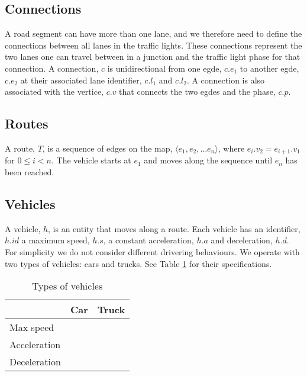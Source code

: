 \subsection{Connections}
A road segment can have more than one lane, and we therefore need to define the connections between all lanes in the traffic lights.
These connections represent the two lanes one can travel between in a junction and the traffic light phase for that connection.
A connection, $c$ is unidirectional from one egde, $c.e_1$ to another egde, $c.e_2$ at their associated lane identifier, $c.l_1$ and $c.l_2$. A connection is also associated with the vertice, $c.v$ that connects the two egdes and the phase, $c.p$.



\begin{comment}
\subsection{Trajectory}
A trajectory, $T$, is a sequence of connected edges on the map, $\langle e_1, e_2, \dots e_n \rangle$, where $e_i.v_2 = e_{i+1}.v_1$ for $0\leq i< n$.
The vehicle starts at $e_1$ and moves along the sequence until $e_n$ has been reached.
\end{comment}

\subsection{Routes}
A route, $T$, is a sequence of edges on the map, $\langle e_1, e_2, \dots e_n \rangle$, where $e_i.v_2 = e_{i+1}.v_1$ for $0\leq i< n$.
The vehicle starts at $e_1$ and moves along the sequence until $e_n$ has been reached.

\subsection{Vehicles}
A vehicle, $h$, is an entity that moves along a route.
Each vehicle has an identifier, $h.id$ a maximum speed, $h.s$, a constant acceleration, $h.a$ and deceleration, $h.d$.
For simplicity we do not consider different drivering behaviours.
We operate with two types of vehicles: cars and trucks. See Table \ref{table.vehicleTypes} for their specifications.
\begin{table}
\centering
\begin{tabular}{|l|l|l|}\hline
				& Car	& Truck \\\hline
Max speed 		& 		& \\\hline
Acceleration 	&		& \\\hline
Deceleration 	&		& \\\hline
\end{tabular}
\caption{Types of vehicles}\label{table.vehicleTypes}
\end{table}

